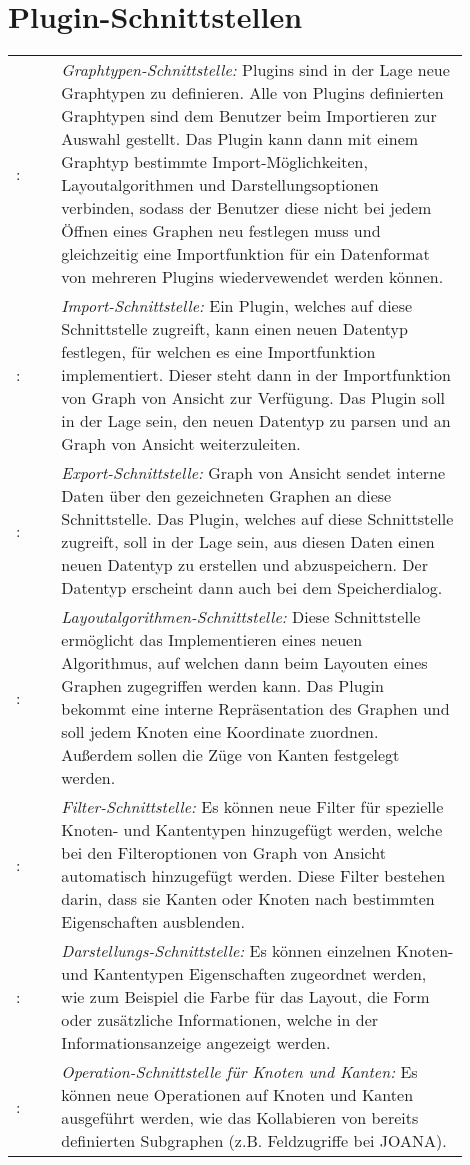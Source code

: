 \chapter{Plugin-Schnittstellen}
\label{ch:plugschnitt}

\setcounter{psnr}{10}
\newcommand{\psno}{\ifnum\value{psnr}<10 00\else\ifnum\value{psnr}<100 0\fi\fi\arabic{psnr}\addtocounter{psnr}{10}}
\renewcommand\thesubsubsection{/S\ifnum\value{psnr}<10 000\else\ifnum\value{psnr}<100 00\else\ifnum\value{psnr}<1000 0\fi\fi\fi\arabic{psnr}/}
\newcommand\ps[2]{\namedlabel{s:#1}{\textbf{/S\psno/}}: & #2 \\ [1ex] }

\begin{tabular}{lp{0.9\linewidth}}
  \ps{graphtyp}{\textit{Graphtypen-Schnittstelle:} Plugins sind in der Lage neue Graphtypen zu definieren. Alle von Plugins definierten Graphtypen sind dem Benutzer beim Importieren zur Auswahl gestellt. Das Plugin kann dann mit einem Graphtyp bestimmte Import-Möglichkeiten, Layoutalgorithmen und Darstellungsoptionen verbinden, sodass der Benutzer diese nicht bei jedem Öffnen eines Graphen neu festlegen muss und gleichzeitig eine Importfunktion für ein Datenformat von mehreren Plugins wiedervewendet werden können.}
  \ps{import}{\textit{Import-Schnittstelle:} Ein Plugin, welches auf diese Schnittstelle zugreift, kann einen neuen Datentyp festlegen, für welchen es eine Importfunktion implementiert. Dieser steht dann in der Importfunktion von Graph von Ansicht zur Verfügung. Das Plugin soll in der Lage sein, den neuen Datentyp zu parsen und an Graph von Ansicht weiterzuleiten.}
  \ps{export}{\textit{Export-Schnittstelle:} Graph von Ansicht sendet interne Daten über den gezeichneten Graphen an diese Schnittstelle. Das Plugin, welches auf diese Schnittstelle zugreift, soll in der Lage sein, aus diesen Daten einen neuen Datentyp zu erstellen und abzuspeichern. Der Datentyp erscheint dann auch bei dem Speicherdialog.}
  \ps{layoutalgo}{\textit{Layoutalgorithmen-Schnittstelle:} Diese Schnittstelle ermöglicht das Implementieren eines neuen Algorithmus, auf welchen dann beim Layouten eines Graphen zugegriffen werden kann. Das Plugin bekommt eine interne Repräsentation des Graphen und soll jedem Knoten eine Koordinate zuordnen. Außerdem sollen die Züge von Kanten festgelegt werden.}
  \ps{filter}{\textit{Filter-Schnittstelle:} Es können neue Filter für spezielle Knoten- und Kantentypen hinzugefügt werden, welche bei den Filteroptionen von Graph von Ansicht automatisch hinzugefügt werden. Diese Filter bestehen darin, dass sie Kanten oder Knoten nach bestimmten Eigenschaften ausblenden.}
  \ps{darstellung}{\textit{Darstellungs-Schnittstelle:} Es können einzelnen Knoten- und Kantentypen Eigenschaften zugeordnet werden, wie zum Beispiel die Farbe für das Layout, die Form oder zusätzliche Informationen, welche in der Informationsanzeige angezeigt werden.}
  \ps{operationen}{\textit{Operation-Schnittstelle für Knoten und Kanten:} Es können neue Operationen auf Knoten und Kanten ausgeführt werden, wie das Kollabieren von bereits definierten Subgraphen (z.B. Feldzugriffe bei JOANA).}
\end{tabular}
